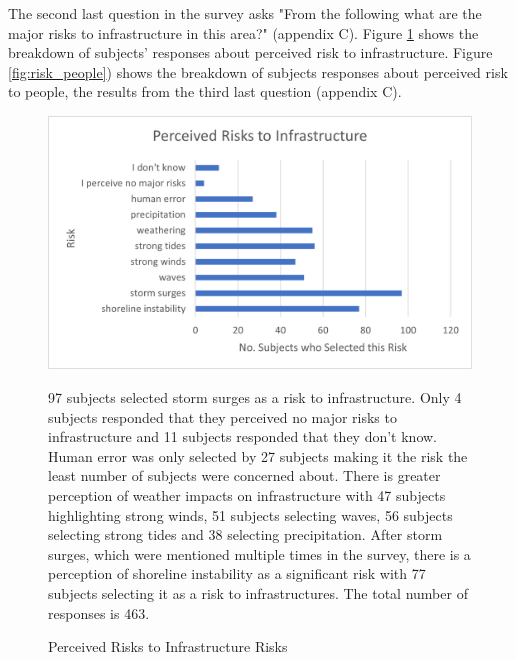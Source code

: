 The second last question in the survey asks "From the following what are the major risks to infrastructure in this area?" (appendix C). Figure \ref{fig:risk_infrastructure} shows the breakdown of subjects' responses about perceived risk to infrastructure. Figure \ref{fig:risk_people}) shows the breakdown of subjects responses about perceived risk to people, the results from the third last question (appendix C).

\begin{figure}[H]
    \centering
    \includegraphics{fig_results/percieved risks to infrastructure.png}
    \caption{Perceived Risks to Infrastructure Risks}{ 97 subjects selected storm surges as a risk to infrastructure. Only 4 subjects responded that they perceived no major risks to infrastructure and 11 subjects responded that they don't know. Human error was only selected by 27 subjects making it the risk the least number of subjects were concerned about. There is greater perception of weather impacts on infrastructure with 47 subjects highlighting strong winds, 51 subjects selecting waves, 56 subjects selecting strong tides and 38 selecting precipitation. After storm surges, which were mentioned multiple times in the survey, there is a perception of shoreline instability as a significant risk with 77 subjects selecting it as a risk to infrastructures.  The total number of responses is 463. }
    \label{fig:risk_infrastructure}
\end{figure}
\paragraph{}


